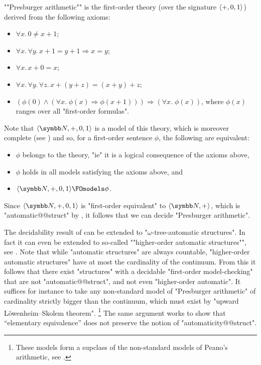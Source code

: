 \begin{remark}
	\AP""Presburger arithmetic"" is the first-order theory (over the signature $\langle+, 0, 1\rangle$)
	derived from the following axioms:
	\begin{itemize}
		\item $\forall x.\, 0 \neq x + 1$;
		\item $\forall x.\,\forall y.\, x + 1 = y + 1 \Rightarrow x = y$;
		\item $\forall x.\, x + 0 = x$;
		\item $\forall x.\,\forall y.\,\forall z.\, x + (y + z) = (x + y) + z$;
		\item $(\phi(0) \land (\forall x.\; \phi(x) \Rightarrow \phi(x+1))) \Rightarrow
			(\forall x.\; \phi(x))$, where $\phi(x)$ ranges over all "first-order formulas".
	\end{itemize}
	Note that $\tup{\N,+,0,1}$ is a model of this theory, which is moreover complete
	(see \cite{Stansifer1984Presburger}) and so, for a first-order sentence $\phi$, the following 
	are equivalent:
	\begin{itemize}
		\item $\phi$ belongs to the theory, "ie" it is a logical consequence of the axioms above,
		\item $\phi$ holds in all models satisfying the axioms above, and 
		\item $\tup{\N, +, 0, 1} \FOmodels \phi$.
	\end{itemize}
	Since $\tup{\N, +, 0, 1}$ is "first-order equivalent" to $\tup{\N, +}$, which
	is "automatic@@struct" by ,
	it follows that we can decide "Presburger arithmetic".
\end{remark}

The decidability result of
 can be extended
to "$\omega$-tree-automatic structures".
In fact it can even be extended to so-called
\AP""higher-order automatic structures"", see
\cite[last remark of \S~XII.2]{Blumensath2024MSOModelTheory}.
Note that while "automatic structures" are always countable,
"higher-order automatic structures" have at most the cardinality of the continuum.
From this it follows that there exist "structures" with a decidable "first-order model-checking" that are not "automatic@@struct", and not even "higher-order automatic".
It suffices for instance to take any non-standard model of "Presburger arithmetic"
of cardinality strictly bigger than the continuum, which must exist by
"upward Löwenheim–Skolem theorem".%
\footnote{These models form a supclass of the non-standard models of Peano's arithmetic,
see \cite[Ex.~2, p.~36 \& \S~11.4]{Hodges1993ModelTheory}.}
The same argument works to show that ``elementary equivalence''
does not preserve the notion of "automaticity@@struct".

